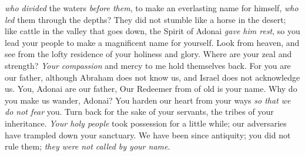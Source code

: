 \begin{biblechapter}
\textit{who divided} the waters \textit{before them}, 
to make an everlasting name for himself,
\verse \textit{who led} them through the depths? 
They did not stumble like a horse in the desert;
\verse like cattle in the valley that goes down, the Spirit of Adonai \textit{gave him rest}, 
so you lead your people to make a magnificent name for yourself.
 Look from heaven, 
and see from the lofty residence of your holiness and glory. 
Where are your zeal and strength? 
\textit{Your compassion} and mercy to me hold themselves back.
\verse For you are our father, although Abraham does not know us, 
and Israel does not acknowledge us. 
You, Adonai are our father, 
Our Redeemer from of old is your name.
\verse Why do you make us wander, Adonai? 
You harden our heart from your ways \textit{so that we do not fear} you. 
Turn back for the sake of your servants, 
the tribes of your inheritance.
\verse \textit{Your holy people} took possession for a little while; 
our adversaries have trampled down your sanctuary.
\verse We have been since antiquity; you did not rule them; 
\textit{they were not called by your name}.
\end{biblechapter}

